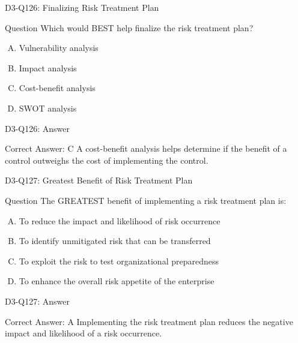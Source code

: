\documentclass{beamer}
\begin{document}
	\begin{frame}{D3-Q126: Finalizing Risk Treatment Plan}
		\begin{block}{Question}
			Which would BEST help finalize the risk treatment plan?
		\end{block}
		\begin{enumerate}[(A)]
			\item Vulnerability analysis
			\item Impact analysis
			\item Cost-benefit analysis
			\item SWOT analysis
		\end{enumerate}
	\end{frame}
	\begin{frame}{D3-Q126: Answer}
		\begin{block}{Correct Answer: C}
			A cost-benefit analysis helps determine if the benefit of a control outweighs the cost of implementing the control.
		\end{block}
	\end{frame}
	
	\begin{frame}{D3-Q127: Greatest Benefit of Risk Treatment Plan}
		\begin{block}{Question}
			The GREATEST benefit of implementing a risk treatment plan is:
		\end{block}
		\begin{enumerate}[(A)]
			\item To reduce the impact and likelihood of risk occurrence
			\item To identify unmitigated risk that can be transferred
			\item To exploit the risk to test organizational preparedness
			\item To enhance the overall risk appetite of the enterprise
		\end{enumerate}
	\end{frame}
	\begin{frame}{D3-Q127: Answer}
		\begin{block}{Correct Answer: A}
			Implementing the risk treatment plan reduces the negative impact and likelihood of a risk occurrence.
		\end{block}
	\end{frame}
	
\end{document}
